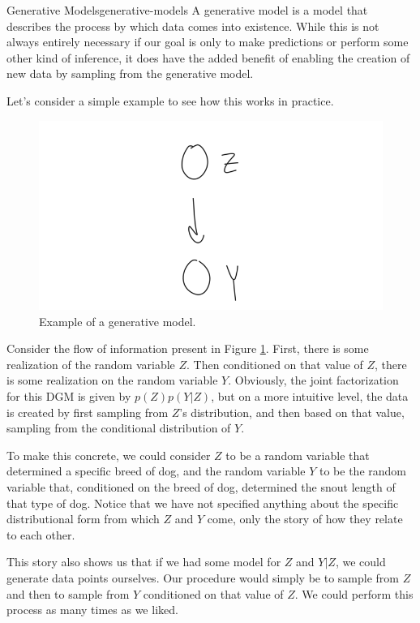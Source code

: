 \begin{definition}{Generative Models}{generative-models}
    A generative model is a model that describes the process by which data comes into existence. While this is not always entirely necessary if our goal is only to make predictions or perform some other kind of inference, it does have the added benefit of enabling the creation of new data by sampling from the generative model.
\end{definition}

Let's consider a simple example to see how this works in practice.
\begin{figure}
    \centering
    \includegraphics[width=0.5\paperwidth]{../GraphicalModels/fig/GenerativeRVExample.png}
    \caption{Example of a generative model.}
    \label{fig:generative-rv}
\end{figure}
Consider the flow of information present in Figure \ref{fig:generative-rv}. First, there is some realization of the random variable $Z$. Then conditioned on that value of $Z$, there is some realization on the random variable $Y$. Obviously, the joint factorization for this DGM is given by $p(Z)p(Y|Z)$, but on a more intuitive level, the data is created by first sampling from $Z$'s distribution, and then based on that value, sampling from the conditional distribution of $Y$.

To make this concrete, we could consider $Z$ to be a random variable that determined a specific breed of dog, and the random variable $Y$ to be the random variable that, conditioned on the breed of dog, determined the snout length of that type of dog. Notice that we have not specified anything about the specific distributional form from which $Z$ and $Y$ come, only the story of how they relate to each other.

This story also shows us that if we had some model for $Z$ and $Y|Z$, we could generate data points ourselves. Our procedure would simply be to sample from $Z$ and then to sample from $Y$ conditioned on that value of $Z$. We could perform this process as many times as we liked.

